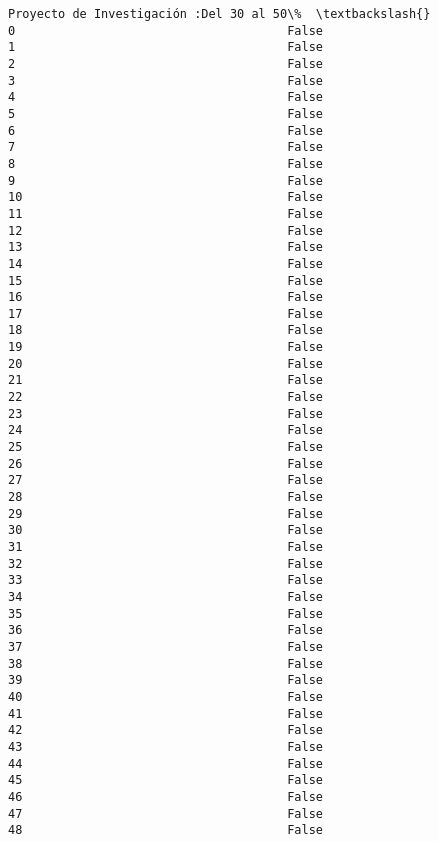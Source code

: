 \documentclass[11pt]{article}
\begin{document}
\begin{Verbatim}[commandchars=\\\{\}]
    Proyecto de Investigación :Del 30 al 50\%  \textbackslash{}
0                                      False   
1                                      False   
2                                      False   
3                                      False   
4                                      False   
5                                      False   
6                                      False   
7                                      False   
8                                      False   
9                                      False   
10                                     False   
11                                     False   
12                                     False   
13                                     False   
14                                     False   
15                                     False   
16                                     False   
17                                     False   
18                                     False   
19                                     False   
20                                     False   
21                                     False   
22                                     False   
23                                     False   
24                                     False   
25                                     False   
26                                     False   
27                                     False   
28                                     False   
29                                     False   
30                                     False   
31                                     False   
32                                     False   
33                                     False   
34                                     False   
35                                     False   
36                                     False   
37                                     False   
38                                     False   
39                                     False   
40                                     False   
41                                     False   
42                                     False   
43                                     False   
44                                     False   
45                                     False   
46                                     False   
47                                     False   
48                                     False   


\end{Verbatim}
\end{document}

